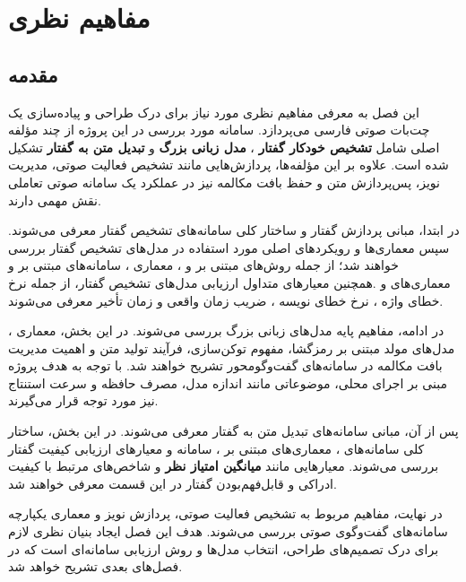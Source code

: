 
\chapter{مفاهیم نظری}

\section{مقدمه}

این فصل به معرفی مفاهیم نظری مورد نیاز برای درک طراحی و پیاده‌سازی
یک چت‌بات صوتی فارسی می‌پردازد.
سامانه مورد بررسی در این پروژه از چند مؤلفه اصلی شامل
\textbf{تشخیص خودکار گفتار}
،
\textbf{مدل زبانی بزرگ}
و
\textbf{تبدیل متن به گفتار}
تشکیل شده است.
علاوه بر این مؤلفه‌ها، پردازش‌هایی مانند تشخیص فعالیت صوتی،
مدیریت نویز، پس‌پردازش متن و حفظ بافت مکالمه نیز در عملکرد
یک سامانه صوتی تعاملی نقش مهمی دارند.

در ابتدا، مبانی پردازش گفتار و ساختار کلی سامانه‌های تشخیص گفتار
معرفی می‌شوند.
سپس معماری‌ها و رویکردهای اصلی مورد استفاده در مدل‌های
تشخیص گفتار بررسی خواهند شد؛ از جمله روش‌های مبتنی بر
 و ، معماری ،
سامانه‌های مبتنی بر  و معماری‌های
 و .همچنین معیارهای متداول ارزیابی مدل‌های تشخیص گفتار،
از جمله نرخ خطای واژه
،
نرخ خطای نویسه
،
ضریب زمان واقعی
و زمان تأخیر
معرفی می‌شوند.

در ادامه، مفاهیم پایه مدل‌های زبانی بزرگ بررسی می‌شوند.
در این بخش، معماری ، مدل‌های مولد مبتنی بر
رمزگشا، مفهوم توکن‌سازی، فرآیند تولید متن و اهمیت مدیریت
بافت مکالمه در سامانه‌های گفت‌وگومحور تشریح خواهند شد.
با توجه به هدف پروژه مبنی بر اجرای محلی، موضوعاتی مانند
اندازه مدل، مصرف حافظه و سرعت استنتاج نیز مورد توجه قرار می‌گیرند.

پس از آن، مبانی سامانه‌های تبدیل متن به گفتار معرفی می‌شوند.
در این بخش، ساختار کلی سامانه‌های ، معماری‌های مبتنی بر
، سامانه  و معیارهای ارزیابی کیفیت گفتار
بررسی می‌شوند.
معیارهایی مانند
\textbf{میانگین امتیاز نظر}
و شاخص‌های مرتبط با کیفیت ادراکی و قابل‌فهم‌بودن گفتار
در این قسمت معرفی خواهند شد.

در نهایت، مفاهیم مربوط به تشخیص فعالیت صوتی،
پردازش نویز و معماری یکپارچه سامانه‌های گفت‌وگوی صوتی
بررسی می‌شوند.
هدف این فصل ایجاد بنیان نظری لازم برای درک تصمیم‌های طراحی،
انتخاب مدل‌ها و روش ارزیابی سامانه‌ای است که در فصل‌های بعدی
تشریح خواهد شد.
